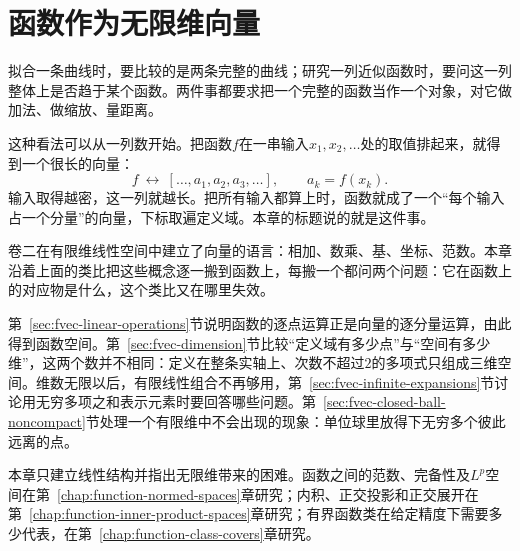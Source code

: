 \chapter{函数作为无限维向量}
\label{chap:functions-as-vectors}
\label{chap:function-spaces}

拟合一条曲线时，要比较的是两条完整的曲线；研究一列近似函数时，要问这一列整体上是否趋于某个函数。两件事都要求把一个完整的函数当作一个对象，对它做加法、做缩放、量距离。

这种看法可以从一列数开始。把函数$f$在一串输入$x_1,x_2,\ldots$处的取值排起来，就得到一个很长的向量：
\[
 f\ \longleftrightarrow\ [\ldots,a_1,a_2,a_3,\ldots],\qquad a_k=f(x_k).
\]
输入取得越密，这一列就越长。把所有输入都算上时，函数就成了一个“每个输入占一个分量”的向量，下标取遍定义域。本章的标题说的就是这件事。

卷二在有限维线性空间中建立了向量的语言：相加、数乘、基、坐标、范数。本章沿着上面的类比把这些概念逐一搬到函数上，每搬一个都问两个问题：它在函数上的对应物是什么，这个类比又在哪里失效。

第~\ref{sec:fvec-linear-operations}节说明函数的逐点运算正是向量的逐分量运算，由此得到函数空间。第~\ref{sec:fvec-dimension}节比较“定义域有多少点”与“空间有多少维”，这两个数并不相同：定义在整条实轴上、次数不超过$2$的多项式只组成三维空间。维数无限以后，有限线性组合不再够用，第~\ref{sec:fvec-infinite-expansions}节讨论用无穷多项之和表示元素时要回答哪些问题。第~\ref{sec:fvec-closed-ball-noncompact}节处理一个有限维中不会出现的现象：单位球里放得下无穷多个彼此远离的点。

本章只建立线性结构并指出无限维带来的困难。函数之间的范数、完备性及$L^p$空间在第~\ref{chap:function-normed-spaces}章研究；内积、正交投影和正交展开在第~\ref{chap:function-inner-product-spaces}章研究；有界函数类在给定精度下需要多少代表，在第~\ref{chap:function-class-covers}章研究。






